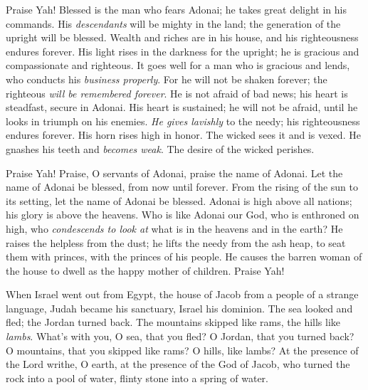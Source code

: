 \begin{biblechapter} %
 Praise Yah! 
Blessed is the man who fears Adonai; 
he takes great delight in his commands.
\verse His \textit{descendants} will be mighty in the land; 
the generation of the upright will be blessed.
\verse Wealth and riches are in his house, 
and his righteousness endures forever.
\verse His light rises in the darkness for the upright; 
he is gracious and compassionate and righteous.
\verse It goes well for a man who is gracious and lends, 
who conducts his \textit{business properly}.
\verse For he will not be shaken forever; 
the righteous \textit{will be remembered forever}.
\verse He is not afraid of bad news; 
his heart is steadfast, secure in Adonai.
\verse His heart is sustained; he will not be afraid, 
until he looks in triumph on his enemies.
\verse \textit{He gives lavishly} to the needy; 
his righteousness endures forever. 
His horn rises high in honor.
\verse The wicked sees it and is vexed. 
He gnashes his teeth and \textit{becomes weak}. 
The desire of the wicked perishes.
\end{biblechapter}

\begin{biblechapter} %
 Praise Yah! 
Praise, O servants of Adonai, 
praise the name of Adonai.
\verse Let the name of Adonai be blessed, 
from now until forever.
\verse From the rising of the sun to its setting, 
let the name of Adonai be blessed.
\verse Adonai is high above all nations; 
his glory is above the heavens.
\verse Who is like Adonai our God, 
who is enthroned on high,
\verse who \textit{condescends to look at} 
what is in the heavens and in the earth?
\verse He raises the helpless from the dust; 
he lifts the needy from the ash heap,
\verse to seat them with princes, 
with the princes of his people.
\verse He causes the barren woman of the house to dwell 
as the happy mother of children. 
Praise Yah!
\end{biblechapter}

\begin{biblechapter} %
 When Israel went out from Egypt, 
the house of Jacob from a people of a strange language,
\verse Judah became his sanctuary, 
Israel his dominion.
\verse The sea looked and fled; 
the Jordan turned back.
\verse The mountains skipped like rams, 
the hills like \textit{lambs}.
\verse What’s with you, O sea, that you fled? 
O Jordan, that you turned back?
\verse O mountains, that you skipped like rams? 
O hills, like lambs?
\verse At the presence of the Lord writhe, O earth, 
at the presence of the God of Jacob,
\verse who turned the rock into a pool of water, 
flinty stone into a spring of water.
\end{biblechapter}

